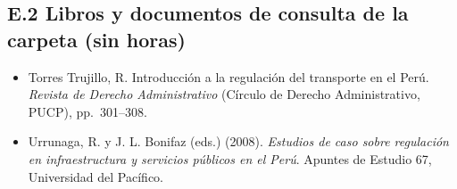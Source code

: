 \documentclass[11pt,a4paper]{article}
\begin{document}
\subsection*{E.2 Libros y documentos de consulta de la carpeta (sin horas)}
{\small
\begin{itemize}[leftmargin=1.4em,itemsep=1pt,label={}]
\item Torres Trujillo, R. Introducción a la regulación del transporte en el Perú. \emph{Revista de Derecho Administrativo} (Círculo de Derecho Administrativo, PUCP), pp.~301--308.
\item Urrunaga, R. y J. L. Bonifaz (eds.) (2008). \emph{Estudios de caso sobre regulación en infraestructura y servicios públicos en el Perú}. Apuntes de Estudio 67, Universidad del Pacífico.
\end{itemize}
}
\end{document}
